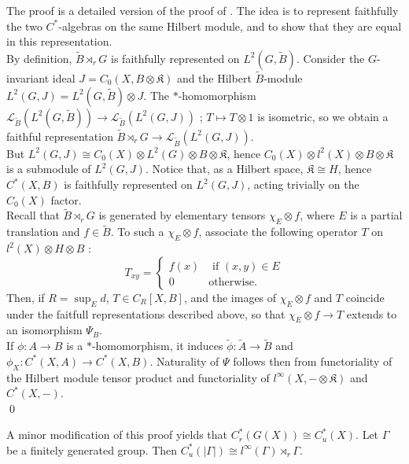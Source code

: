 \begin{dem}
The proof is a detailed version of the proof of \cite{SkTuYu}. The idea is to represent faithfully the two $C^*$-algebras on the same Hilbert module, and to show that they are equal in this representation.\\

By definition, $\tilde B\rtimes_r G$ is faithfully represented on $L^2(G,\tilde B)$. Consider the $G$-invariant ideal $J= C_0(X,B\otimes\mathfrak K)$ and the Hilbert $\tilde B$-module $L^2(G,J) = L^2(G,\tilde B)\otimes J$. The $*$-homomorphism $\mathcal L_{\tilde B}(L^2(G,\tilde B)) \rightarrow \mathcal L_{\tilde B}(L^2(G,J))$ ; $T\mapsto T\otimes 1 $ is isometric, so we obtain a faithful representation $\tilde B\rtimes_r G \rightarrow \mathcal L_{\tilde B}(L^2(G,J))$.\\

But $L^2(G,J)  \cong C_0(X) \otimes L^2(G)\otimes B\otimes \mathfrak K$, hence $C_0(X)\otimes l^2(X) \otimes B \otimes \mathfrak K$ is a submodule of $L^2(G,J)$. Notice that, as a Hilbert space, $\mathfrak K \cong H$, hence $C^*(X,B)$ is faithfully represented on $L^2(G,J)$, acting trivially on the $C_0(X)$ factor. \\

Recall that $\tilde B\rtimes_r G$ is generated by elementary tensors $\chi_E\otimes f$, where $E$ is a partial translation and $f\in\tilde B$. To such a $\chi_E\otimes f$, associate the following operator $T$ on $l^2(X)\otimes H\otimes B$ : 
\[T_{xy} =\left\{\begin{array}{ll} f(x) & \text{ if }(x,y)\in E\\ 0 & \text{otherwise.}\end{array}\right. \]
Then, if $R=\sup_E d$, $T\in C_R[X,B]$, and the images of $\chi_E\otimes f$ and $T$ coincide under the faitfull representations described above, so that $\chi_E\otimes f\rightarrow T$ extends to an isomorphism $\Psi_B$.\\

If $\phi : A\rightarrow B$ is a $*$-homomorphism, it induces $\tilde \phi : \tilde A\rightarrow \tilde B$ and $\phi_X : C^*(X,A)\rightarrow C^*(X,B)$. Naturality of $\Psi$ follows then from functoriality of the Hilbert module tensor product and functoriality of $l^\infty(X, - \otimes \mathfrak K)$ and $C^*(X, - )$.\\   
\qed
\end{dem}

\begin{rk} A minor modification of this proof yields that $C_r^*(G(X))\cong C^*_u(X)$. Let $\Gamma$ be a finitely generated group. Then $C_u^*(| \Gamma |)\cong l^\infty( \Gamma)\rtimes_r \Gamma  $.
\end{rk}
